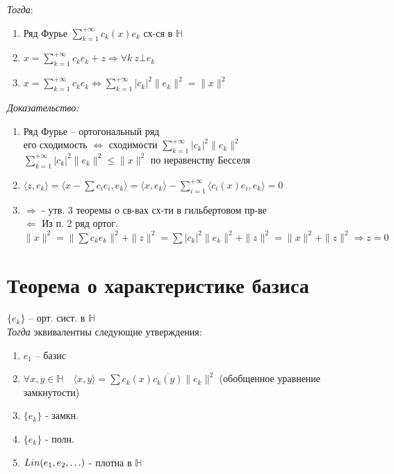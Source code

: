 \documentclass[paper=a4, fontsize=17pt]{article}
\begin{document}
\emph{Тогда}:
\begin{enumerate}
	\item Ряд Фурье $\sum\limits_{k=1}^{+\infty} c_k(x) e_k$ сх-ся в $\mathds{H}$
	\item $x =\sum\limits_{k=1}^{+\infty} c_k e_k + z \Rightarrow \forall k \ z \bot e_k$
	\item $x =\sum\limits_{k=1}^{+\infty} c_k e_k \Leftrightarrow \sum\limits_{k=1}^{+\infty} \vert c_k \vert^2 \|e_k\|^2=\|x\|^2$
\end{enumerate}

\emph{Доказательство:}
\begin{enumerate}
	\item
	Ряд Фурье -- ортогональный ряд\\
	его сходимость $\Leftrightarrow$ сходимости $\sum\limits_{k=1}^{+\infty} \vert c_k \vert^2 \|e_k\|^2$\\
	$\sum\limits_{k=1}^{+\infty} \vert c_k \vert^2 \|e_k\|^2 \le \|x\|^2$ по неравенству Бесселя
	\item
	$\langle z, e_k \rangle = \langle x - \sum c_i e_i, e_k \rangle = \langle x, e_k \rangle - \sum\limits_{i = 1}^{+\infty}  \langle c_i(x) e_i ,e_k \rangle = 0$
	\item
	$\Rightarrow$ - утв. 3 теоремы о св-вах сх-ти в гильбертовом пр-ве\\
	$\Leftarrow$
		Из п. 2 ряд ортог.\\
		$\|x\|^2=\|\sum c_k e_k\|^2 + \|z\|^2 = \sum \vert c_k \vert^2 \|e_k\|^2 + \|z\|^2 = \|x\|^2 + \|z\|^2 \Rightarrow z = 0$
\end{enumerate}

\section{Теорема о характеристике базиса}

$\{e_k\}$ -- орт. сист. в $\mathds{H}$\\

\emph{Тогда} эквивалентны следующие утверждения:
\begin{enumerate}
	\item $e_1$ -- базис
	\item $\forall x, y \in \mathds{H} \quad \langle x, y \rangle = \sum c_k(x)\overline{c_k(y)}\|e_k\|^2$ (обобщенное уравнение замкнутости)
	\item $\{e_k\}$ - замкн.
	\item $\{e_k\}$ - полн.
	\item $Lin(e_1, e_2, \mathellipsis)$ - плотна в $\mathds{H}$
\end{enumerate}
\end{document}
